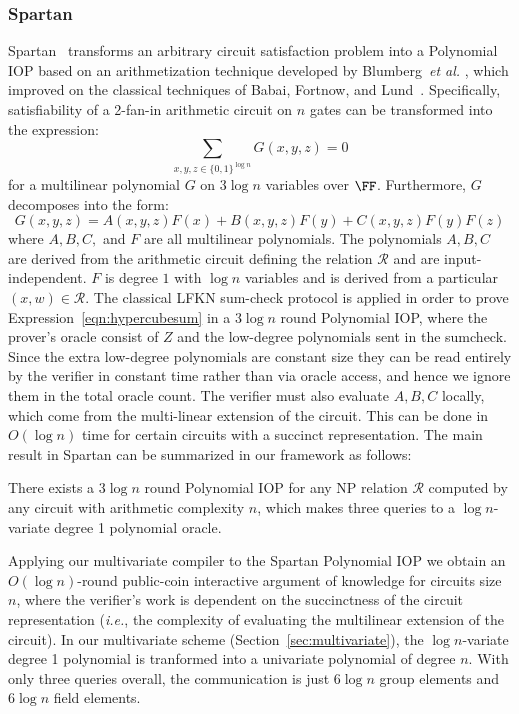 
\subsubsection{Spartan}
\textsf{Spartan}~\cite{Spartan} transforms an arbitrary circuit satisfaction problem into a Polynomial IOP based on an arithmetization technique developed by Blumberg~\emph{et al.} \cite{EPRINT:BTVW14}, which improved on the classical techniques of Babai, Fortnow, and Lund~\cite{BFL}. Specifically, satisfiability of a 2-fan-in arithmetic circuit on $n$ gates can be transformed into the expression: 
\begin{equation}\label{eqn:hypercubesum}
\sum_{x, y, z \in \{0,1\}^{\log n}} G(x, y, z) = 0
\end{equation} 
for a multilinear polynomial $G$ on $3 \log n$ variables over $\FF$. 
Furthermore, $G$ decomposes into the form: 
$$G(x,y,z) = A(x,y,z) F(x) + B(x, y, z) F(y) + C(x, y, z) F(y) F(z)$$
where $A, B, C,$ and $F$ are all multilinear polynomials. The polynomials $A, B, C$ are derived from the arithmetic circuit defining the relation $\mathcal{R}$ and are input-independent. $F$ is degree $1$ with $\log n$ variables and is derived from a particular $(x, w) \in \mathcal{R}$. The classical LFKN sum-check protocol %
is applied in order to prove Expression~\ref{eqn:hypercubesum} in a $3\log n$ round Polynomial IOP, where the prover's oracle consist of $Z$ and the low-degree polynomials sent in the sumcheck. Since the extra low-degree polynomials are constant size they can be read entirely by the verifier in constant time rather than via oracle access, and hence we ignore them in the total oracle count. The verifier must also evaluate $A, B, C$ locally, which come from the multi-linear extension of the circuit. This can be done in $O(\log n )$ time for certain circuits with a succinct representation. The main result in Spartan can be summarized in our framework as follows: 

\begin{theorem}
There exists a $3 \log n$ round Polynomial IOP for any NP relation $\mathcal{R}$ computed by any circuit with arithmetic complexity $n$, which makes three queries to a $\log n$-variate degree 1 polynomial oracle. %
\end{theorem}

Applying our multivariate compiler to the \textsf{Spartan} Polynomial IOP we obtain an $O(\log n)$-round public-coin interactive argument of knowledge for circuits size $n$, where the verifier's work is dependent on the succinctness of the circuit representation (\emph{i.e.}, the complexity of evaluating the multilinear extension of the circuit). In our multivariate scheme (Section~\ref{sec:multivariate}), the $\log n$-variate degree 1 polynomial is tranformed into a univariate polynomial of degree $n$. With only three queries overall, the communication is just $6 \log n$ group elements and $6 \log n$ field elements. 

